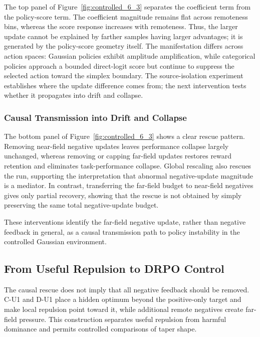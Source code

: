 \documentclass{article}
\theoremstyle{plain}
\theoremstyle{definition}
\theoremstyle{remark}
\begin{document}
The top panel of Figure~\ref{fig:controlled_6_3} separates the
coefficient term from the policy-score term. The coefficient magnitude
remains flat across remoteness bins, whereas the score response increases
with remoteness. Thus, the larger update cannot be explained
by farther samples having larger advantages; it is generated by the
policy-score geometry itself. The manifestation differs across action
spaces: Gaussian policies exhibit amplitude amplification, while
categorical policies approach a bounded direct-logit score but continue
to suppress the selected action toward the simplex boundary. The source-isolation experiment establishes where the update difference comes
from; the next intervention tests whether it propagates into drift and
collapse.

\subsubsection{Causal Transmission into Drift and Collapse}
\label{sec:controlled_transmission}

The bottom panel of Figure~\ref{fig:controlled_6_3} shows a clear rescue
pattern. Removing near-field negative updates leaves performance collapse
largely unchanged, whereas removing or capping far-field updates restores
reward retention and eliminates task-performance collapse. Global
rescaling also rescues the run, supporting the interpretation that
abnormal negative-update magnitude is a mediator. In contrast,
transferring the far-field budget to near-field negatives gives only
partial recovery, showing that the rescue is not obtained by simply
preserving the same total negative-update budget.

These interventions identify the far-field negative update, rather than
negative feedback in general, as a causal transmission path to policy
instability in the controlled Gaussian environment.

\subsection{From Useful Repulsion to DRPO Control}
\label{sec:repulsion_control}

The causal rescue does not imply that all negative feedback should be removed.
C-U1 and D-U1 place a hidden optimum beyond the positive-only target and make
local repulsion point toward it, while additional remote negatives create
far-field pressure. This construction separates useful repulsion from harmful
dominance and permits controlled comparisons of taper shape.
\end{document}
